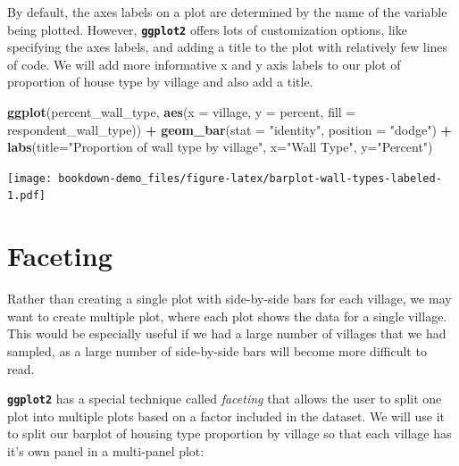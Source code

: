 \documentclass[]{book}
\newenvironment{Shaded}{\begin{snugshade}}{\end{snugshade}}
\newcommand{\KeywordTok}[1]{\textcolor[rgb]{0.13,0.29,0.53}{\textbf{#1}}}
\newcommand{\DataTypeTok}[1]{\textcolor[rgb]{0.13,0.29,0.53}{#1}}
\newcommand{\StringTok}[1]{\textcolor[rgb]{0.31,0.60,0.02}{#1}}
\newcommand{\OperatorTok}[1]{\textcolor[rgb]{0.81,0.36,0.00}{\textbf{#1}}}
\newcommand{\NormalTok}[1]{#1}
\begin{document}
By default, the axes labels on a plot are determined by the name of the
variable being plotted. However, \textbf{\texttt{ggplot2}} offers lots
of customization options, like specifying the axes labels, and adding a
title to the plot with relatively few lines of code. We will add more
informative x and y axis labels to our plot of proportion of house type
by village and also add a title.

\begin{Shaded}
\begin{Highlighting}[]
\KeywordTok{ggplot}\NormalTok{(percent_wall_type, }\KeywordTok{aes}\NormalTok{(}\DataTypeTok{x =}\NormalTok{ village, }\DataTypeTok{y =}\NormalTok{ percent, }\DataTypeTok{fill =}\NormalTok{ respondent_wall_type)) }\OperatorTok{+}
\StringTok{    }\KeywordTok{geom_bar}\NormalTok{(}\DataTypeTok{stat =} \StringTok{"identity"}\NormalTok{, }\DataTypeTok{position =} \StringTok{"dodge"}\NormalTok{) }\OperatorTok{+}
\StringTok{    }\KeywordTok{labs}\NormalTok{(}\DataTypeTok{title=}\StringTok{"Proportion of wall type by village"}\NormalTok{,}
         \DataTypeTok{x=}\StringTok{"Wall Type"}\NormalTok{,}
         \DataTypeTok{y=}\StringTok{"Percent"}\NormalTok{)}
\end{Highlighting}
\end{Shaded}

\texttt{[image: bookdown-demo\_files/figure-latex/barplot-wall-types-labeled-1.pdf]}

\section{Faceting}\label{faceting}

Rather than creating a single plot with side-by-side bars for each
village, we may want to create multiple plot, where each plot shows the
data for a single village. This would be especially useful if we had a
large number of villages that we had sampled, as a large number of
side-by-side bars will become more difficult to read.

\textbf{\texttt{ggplot2}} has a special technique called \emph{faceting}
that allows the user to split one plot into multiple plots based on a
factor included in the dataset. We will use it to split our barplot of
housing type proportion by village so that each village has it's own
panel in a multi-panel plot:
\end{document}
